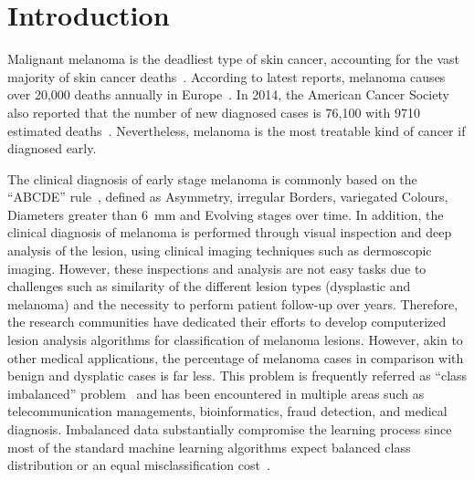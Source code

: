 \graphicspath{ {./content/intro/figures/} }

\section{Introduction}
\label{sec:intro}  %

Malignant melanoma is the deadliest type of skin cancer, accounting for the vast majority of skin cancer deaths~\cite{CancerFactsFigures2014}. 
According to latest reports, melanoma causes over 20,000 deaths annually in Europe~\cite{forsea2012melanoma}. 
In 2014, the American Cancer Society also reported that the number of new diagnosed cases is 76,100 with 9710 estimated deaths~\cite{CancerFactsFigures2014}. 
Nevertheless, melanoma is the most treatable kind of cancer if diagnosed early. 

The clinical diagnosis of early stage melanoma is commonly based on the ``ABCDE'' rule~\cite{abbasi2004early}, defined as Asymmetry, irregular Borders, variegated Colours, Diameters greater than \SI{6}{\milli \metre} and Evolving stages over time. 
In addition, the clinical diagnosis of melanoma is performed through visual inspection and deep analysis of the lesion, using clinical imaging techniques such as dermoscopic imaging. 
However, these inspections and analysis are not easy tasks due to challenges such as similarity of the different lesion types (dysplastic and melanoma) and the necessity to perform patient follow-up over years.
Therefore, the research communities have dedicated their efforts to develop computerized lesion analysis algorithms for classification of melanoma lesions. 
However, akin to other medical applications, the percentage of melanoma cases in comparison with benign and dysplatic cases is far less. 
This problem is frequently referred as ``class imbalanced'' problem~\cite{prati2009data} and has been encountered in multiple areas such as telecommunication managements, bioinformatics, fraud detection, and medical diagnosis. 
Imbalanced data substantially compromise the learning process since most of the standard machine learning algorithms expect balanced class distribution or an equal misclassification cost~\cite{he2009learning}.

